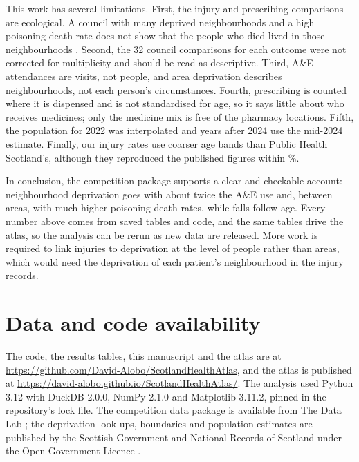 \documentclass[11pt,a4paper]{article}
\begin{document}
This work has several limitations. First, the injury and prescribing comparisons are ecological. A
council with many deprived neighbourhoods and a high poisoning death rate does not show that the
people who died lived in those neighbourhoods \citep{robinson1950}. Second, the 32 council
comparisons for each outcome were not corrected for multiplicity and should be read as
descriptive. Third, A\&E attendances are visits, not people, and area deprivation describes
neighbourhoods, not each person's circumstances. Fourth, prescribing is counted where it is
dispensed and is not standardised for age, so it says little about who receives medicines; only the
medicine mix is free of the pharmacy locations. Fifth, the population for 2022 was interpolated and
years after 2024 use the mid-2024 estimate. Finally, our injury rates use coarser age bands than
Public Health Scotland's, although they reproduced the published figures within \valWorst\%.

In conclusion, the competition package supports a clear and checkable account: neighbourhood
deprivation goes with about twice the A\&E use and, between areas, with much higher poisoning death
rates, while falls follow age. Every number above comes from saved tables and code, and the same
tables drive the atlas, so the analysis can be rerun as new data are released. More work is
required to link injuries to deprivation at the level of people rather than areas, which would need
the deprivation of each patient's neighbourhood in the injury records.

\section{Data and code availability}
\label{sec:availability}

The code, the results tables, this manuscript and the atlas are at
\url{https://github.com/David-Alobo/ScotlandHealthAtlas}, and the atlas is published at
\url{https://david-alobo.github.io/ScotlandHealthAtlas/}. The analysis used Python 3.12 with
DuckDB 2.0.0, NumPy 2.1.0 and Matplotlib 3.11.2, pinned in the repository's lock file. The
competition data package is available from The Data Lab \citep{datalab2026}; the deprivation
look-ups, boundaries and population estimates are published by the Scottish Government and National
Records of Scotland under the Open Government Licence \citep{simd2020,nrssape}.



\end{document}

